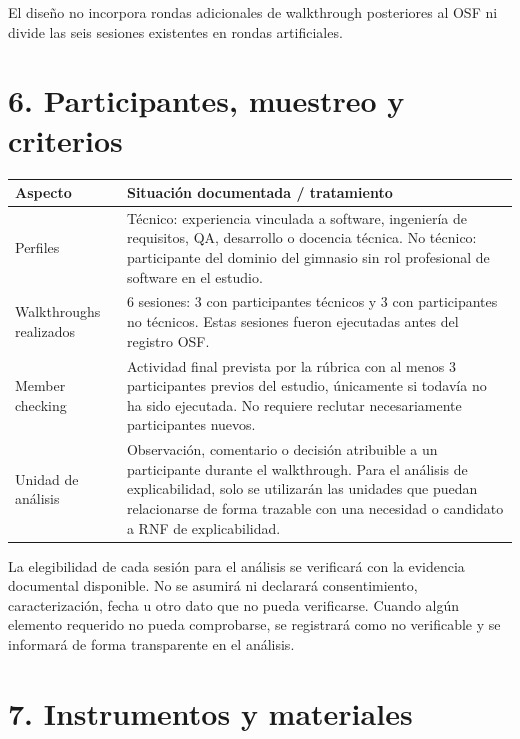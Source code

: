 \documentclass[9pt,a4paper]{extarticle}
\begin{document}
El diseño no incorpora rondas adicionales de walkthrough posteriores al OSF ni divide las seis sesiones existentes en rondas artificiales.

\section*{6. Participantes, muestreo y criterios}

\begin{longtable}{@{}p{}p{}@{}}
\toprule
\textbf{Aspecto} & \textbf{Situación documentada / tratamiento} \\
\midrule
\endhead
Perfiles & Técnico: experiencia vinculada a software, ingeniería de requisitos, QA, desarrollo o docencia técnica. No técnico: participante del dominio del gimnasio sin rol profesional de software en el estudio. \\
Walkthroughs realizados & 6 sesiones: 3 con participantes técnicos y 3 con participantes no técnicos. Estas sesiones fueron ejecutadas antes del registro OSF. \\
Member checking & Actividad final prevista por la rúbrica con al menos 3 participantes previos del estudio, únicamente si todavía no ha sido ejecutada. No requiere reclutar necesariamente participantes nuevos. \\
Unidad de análisis & Observación, comentario o decisión atribuible a un participante durante el walkthrough. Para el análisis de explicabilidad, solo se utilizarán las unidades que puedan relacionarse de forma trazable con una necesidad o candidato a RNF de explicabilidad. \\
\bottomrule
\end{longtable}

La elegibilidad de cada sesión para el análisis se verificará con la evidencia documental disponible. No se asumirá ni declarará consentimiento, caracterización, fecha u otro dato que no pueda verificarse. Cuando algún elemento requerido no pueda comprobarse, se registrará como no verificable y se informará de forma transparente en el análisis.

\section*{7. Instrumentos y materiales}
\end{document}

